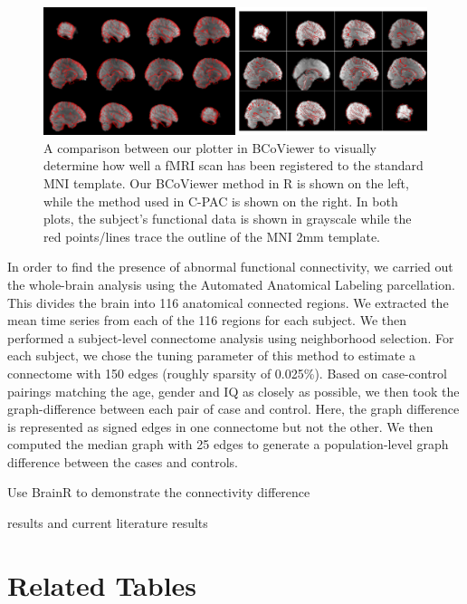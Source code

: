 \documentclass{nature}
\begin{document}
\begin{figure}[tb]
\centering
\includegraphics[width=400pt]{fig/brainconductor/comparison.png}
\caption{A comparison between our plotter in BCoViewer to visually determine how well
a fMRI scan has been registered to the standard MNI template. Our BCoViewer method in R
is shown on the left, while the method used in C-PAC is shown on the right. In 
both plots, the subject's functional data is shown in grayscale while the red points/lines
trace the outline of the MNI 2mm template.}
\label{fig:overlap}
\end{figure}

In order to find the presence of abnormal functional connectivity, we 
carried out the whole-brain analysis using the Automated Anatomical Labeling\cite{tzourio2002automated} parcellation. This divides the brain into
116 anatomical connected regions. We extracted the mean time series from each
of the 116 regions for each subject. We then performed a subject-level connectome
analysis using neighborhood selection\cite{meinshausen2006high}. For
each subject, we chose the tuning
parameter of this method to estimate a connectome with 150 edges (roughly sparsity
of 0.025\%). 
Based on case-control pairings matching the age, gender and IQ as closely as possible,
we then took the graph-difference between each pair of case and control. Here,
the graph difference is represented as signed edges in one connectome but not the other. 
We then computed the median graph\cite{han2013sparse} with 
25 edges 
to generate a population-level graph difference between the cases and controls.

{\color{red}Use BrainR to demonstrate the connectivity difference}

{\color{red}results and current literature results}

\newpage
\appendix

\section{Related Tables}
\end{document}
